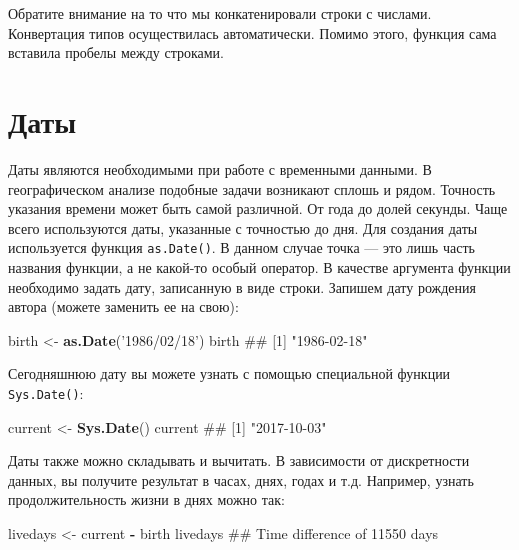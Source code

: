 \documentclass[]{book}
\newenvironment{Shaded}{\begin{snugshade}}{\end{snugshade}}
\newcommand{\KeywordTok}[1]{\textcolor[rgb]{0.13,0.29,0.53}{\textbf{#1}}}
\newcommand{\StringTok}[1]{\textcolor[rgb]{0.31,0.60,0.02}{#1}}
\newcommand{\OperatorTok}[1]{\textcolor[rgb]{0.81,0.36,0.00}{\textbf{#1}}}
\newcommand{\NormalTok}[1]{#1}
\begin{document}
Обратите внимание на то что мы конкатенировали строки с числами.
Конвертация типов осуществилась автоматически. Помимо этого, функция
сама вставила пробелы между строками.

\section{Даты}\label{dates}

Даты являются необходимыми при работе с временными данными. В
географическом анализе подобные задачи возникают сплошь и рядом.
Точность указания времени может быть самой различной. От года до долей
секунды. Чаще всего используются даты, указанные с точностью до дня. Для
создания даты используется функция \texttt{as.Date()}. В данном случае
точка --- это лишь часть названия функции, а не какой-то особый
оператор. В качестве аргумента функции необходимо задать дату,
записанную в виде строки. Запишем дату рождения автора (можете заменить
ее на свою):

\begin{Shaded}
\begin{Highlighting}[]
\NormalTok{birth <-}\StringTok{ }\KeywordTok{as.Date}\NormalTok{(}\StringTok{'1986/02/18'}\NormalTok{)}
\NormalTok{birth}
\NormalTok{## [1] "1986-02-18"}
\end{Highlighting}
\end{Shaded}

Сегодняшнюю дату вы можете узнать с помощью специальной функции
\texttt{Sys.Date()}:

\begin{Shaded}
\begin{Highlighting}[]
\NormalTok{current <-}\StringTok{ }\KeywordTok{Sys.Date}\NormalTok{()}
\NormalTok{current}
\NormalTok{## [1] "2017-10-03"}
\end{Highlighting}
\end{Shaded}

Даты также можно складывать и вычитать. В зависимости от дискретности
данных, вы получите результат в часах, днях, годах и т.д. Например,
узнать продолжительность жизни в днях можно так:

\begin{Shaded}
\begin{Highlighting}[]
\NormalTok{livedays <-}\StringTok{ }\NormalTok{current }\OperatorTok{-}\StringTok{ }\NormalTok{birth}
\NormalTok{livedays}
\NormalTok{## Time difference of 11550 days}
\end{Highlighting}
\end{Shaded}
\end{document}
